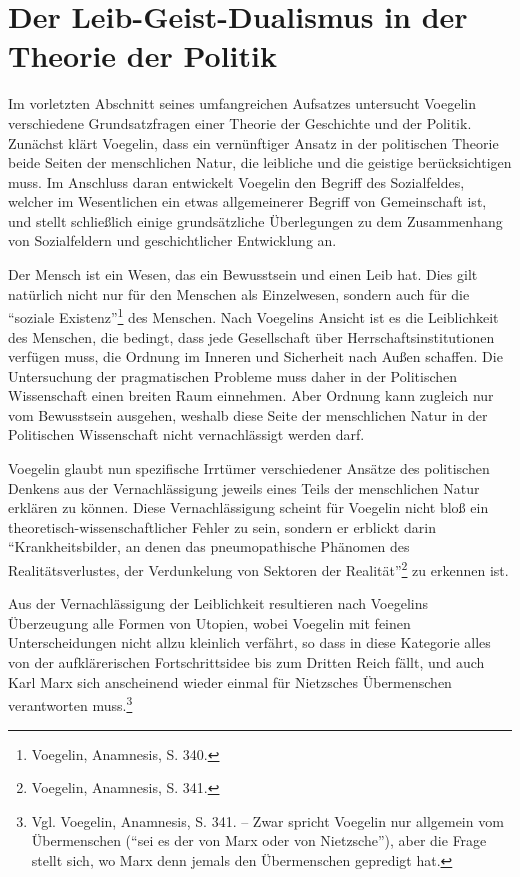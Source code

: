\section{Der Leib-Geist-Dualismus in der Theorie der Politik}

Im vorletzten Abschnitt seines umfangreichen Aufsatzes untersucht Voegelin
verschiedene Grundsatzfragen einer Theorie der Geschichte und der Politik.
Zunächst klärt Voegelin, dass ein vernünftiger Ansatz in der politischen Theorie
beide Seiten der menschlichen Natur, die leibliche und die geistige
berücksichtigen muss. Im Anschluss daran entwickelt Voegelin den Begriff des
Sozialfeldes, welcher im Wesentlichen ein etwas allgemeinerer Begriff von
Gemeinschaft ist, und stellt schließlich einige grundsätzliche Überlegungen zu
dem Zusammenhang von Sozialfeldern und geschichtlicher Entwicklung an.

Der Mensch ist ein Wesen, das ein Bewusstsein und einen Leib hat. Dies gilt
natürlich nicht nur für den Menschen als Einzelwesen, sondern auch für die
"`soziale Existenz"'\footnote{Voegelin, Anamnesis, S. 340.} des Menschen. Nach
Voegelins Ansicht ist es die Leiblichkeit des Menschen, die bedingt, dass jede
Gesellschaft über Herrschaftsinstitutionen verfügen muss, die Ordnung im
Inneren und Sicherheit nach Außen schaffen. Die Untersuchung der pragmatischen
Probleme muss daher in der Politischen Wissenschaft einen breiten Raum
einnehmen. Aber Ordnung kann zugleich nur vom Bewusstsein ausgehen, weshalb
diese Seite der menschlichen Natur in der Politischen Wissenschaft nicht
vernachlässigt werden darf.

Voegelin glaubt nun spezifische Irrtümer verschiedener Ansätze des politischen
Denkens aus der Vernachlässigung jeweils eines Teils der menschlichen Natur
erklären zu können. Diese Vernachlässigung scheint für Voegelin nicht bloß ein
theoretisch-wissenschaftlicher Fehler zu sein, sondern er erblickt darin 
"`Krankheitsbilder, an denen das pneumopathische Phänomen des
Realitätsverlustes, der Verdunkelung von Sektoren der
Realität"'\footnote{Voegelin, Anamnesis, S. 341.} zu erkennen ist.

Aus der Vernachlässigung der Leiblichkeit resultieren nach Voegelins
Überzeugung alle Formen von Utopien, wobei Voegelin mit feinen
Unterscheidungen nicht allzu kleinlich verfährt, so dass in diese Kategorie
alles von der aufklärerischen Fortschrittsidee bis zum Dritten Reich fällt,
und auch Karl Marx sich anscheinend wieder einmal für Nietzsches Übermenschen
verantworten muss.\footnote{Vgl. Voegelin, Anamnesis, S. 341. -- Zwar spricht
  Voegelin nur allgemein vom Übermenschen ("`sei es der von Marx oder von
  Nietzsche"'), aber die Frage stellt sich, wo Marx denn jemals den
  Übermenschen gepredigt hat.}

